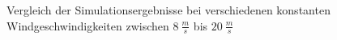 \begin{figure}[H]
   \centering
   \caption[Vergleich bei Verschiedenen Windgeschwindigkeiten]{Vergleich der Simulationsergebnisse bei verschiedenen konstanten Windgeschwindigkeiten zwischen $\SI{8}{\frac{m}{s}}$ bis $\SI{20}{\frac{m}{s}}$}
   \label{fig:Bild4.10}
\end{figure}

